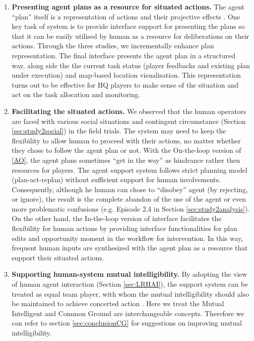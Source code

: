 \begin{enumerate}
\item \textbf{Presenting agent plans as a resource for situated actions.} The agent ``plan'' itself is a representation of actions and their projective effects \cite{Suchman1987}. One key task of system is to provide interface support for presenting the plans so that it can be easily utilised by human as a resource for deliberations on their actions. Through the three studies, we incrementally enhance plan representation. The final interface presents the agent plan in a structured way,  along side the the current task status (player feedbacks and existing plan under execution) and map-based location visualisation. This representation turns out to be effective for HQ players to make sense of the situation and act on the task allocation and monitoring.\\

\item \textbf{Facilitating the situated actions.} We observed that the human operators are faced with various social situations and contingent circumstance (Section \ref{sec:study2social}) in the field trials. The system may need to keep the flexibility to allow human to proceed with their actions, no matter whether they chose to follow the agent plan or not. With the On-the-loop version of \ref{AO}, the agent plans sometimes ``get in the way'' as hindrance rather then resources for players. The agent support system follows strict planning model (plan-act-replan) without sufficient support for human involvements. Consequently, although he human can chose to ``disobey'' agent (by rejecting, or ignore), the result is the complete abandon of the use of the agent or even more problematic confusions (e.g. Episode 2.4 in Section \ref{sec:study2analysis}). On the other hand, the In-the-loop version of interface facilitates the flexibility for human actions by providing interface functionalities for plan edits and opportunity moment in the workflow for intervention. In this way, frequent human inputs are synthesized with the agent plan as a resource that support their situated actions. \\

\item \textbf{Supporting human-system mutual intelligibility.} By adopting the view of human agent interaction (Section \ref{sec:LRHAI}), the support system can be treated as equal team player, with whom the mutual intelligibility should also be maintained to achieve concerted action \cite{Suchman1987}. Here we treat the Mutual Intelligent and Common Ground are interchangeable concepts.  Therefore we can refer to section \ref{sec:conclusionCG} for suggestions on improving mutual intelligibility. \\
\end{enumerate}

